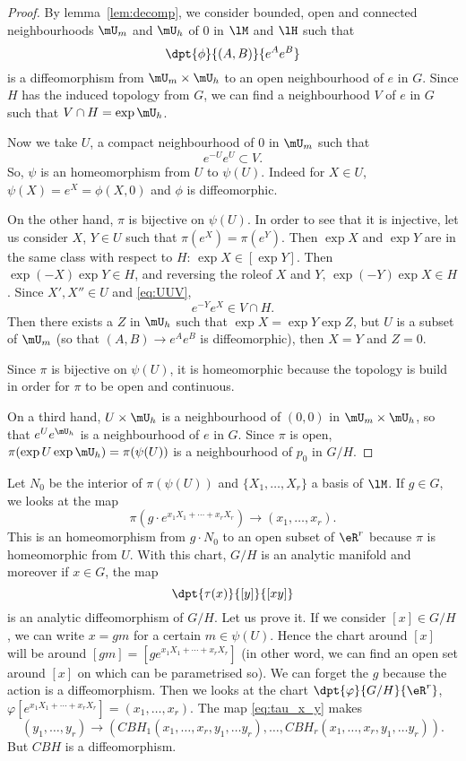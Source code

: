 \begin{proof}
By lemma~\ref{lem:decomp}, we consider bounded, open and connected neighbourhoods $\mU_m$ and $\mU_h$ of $0$ in $\lM$ and $\lH$ such that
\[
  \dpt{\phi}{(A,B)}{e^Ae^B}
\]
is a diffeomorphism from $\mU_m\times\mU_h$ to an open neighbourhood of $e$ in $G$. Since $H$ has the induced topology from $G$, we can find a neighbourhood $V$ of $e$ in $G$ such that $V\cap H=\exp\mU_h$.

Now we take $U$, a compact neighbourhood of $0$ in $\mU_m$ such that
\begin{equation}\label{eq:UUV}
  e^{-U}e^{U}\subset V.
\end{equation}
So, $\psi$ is an homeomorphism from $U$ to $\psi(U)$. Indeed for $X\in U$, $\psi(X)=e^X=\phi(X,0)$ and $\phi$ is diffeomorphic.

On the other hand, $\pi$ is bijective on $\psi(U)$. In order to see that it is injective, let us consider $X$, $Y\in U$ such that $\pi(e^{X})=\pi(e^{Y})$. Then $\exp X$ and $\exp Y$ are in the same class with respect to $H$: $\exp X\in[\exp Y]$. Then $\exp(-X)\exp Y\in H$, and reversing the role\angl of $X$ and $Y$, $\exp(-Y)\exp X\in H$. Since $X',X''\in U$ and \eqref{eq:UUV},
\[
  e^{-Y}e^{X}\in V\cap H.
\]
Then there exists a $Z$ in $\mU_h$ such that $\exp X=\exp Y\exp Z$, but $U$ is a subset of $\mU_m$ (so that $(A,B)\to e^Ae^B$ is diffeomorphic), then $X=Y$ and $Z=0$.

Since $\pi$ is bijective on $\psi(U)$, it is homeomorphic because the topology is build in order for $\pi$ to be open and continuous.

On a third hand, $U\times\mU_h$ is a neighbourhood of $(0,0)$ in $\mU_m\times\mU_h$, so that $e^Ue^{\mU_h}$ is a neighbourhood of $e$ in $G$. Since $\pi$ is open, $\pi(\exp U\exp \mU_h)=\pi(\psi(U))$ is a neighbourhood of $p_0$ in $G/H$.
\end{proof}


Let $N_0$ be the interior of $\pi(\psi(U))$ and $\{X_1,\ldots, X_r\}$ a basis of $\lM$. If $g\in G$, we looks at the map
\[
  \pi(g\cdot e^{x_1X_1+\cdots+x_rX_r})\to(x_1,\ldots,x_r).
\]
This is an homeomorphism from $g\cdot N_0$ to an open subset of $\eR^r$ because $\pi$ is homeomorphic from $U$. With this chart, $G/H$ is an analytic manifold  and moreover if $x\in G$, the map
\begin{equation}\label{eq:tau_x_y}
  \dpt{\tau(x)}{[y]}{[xy]}
\end{equation}
is an analytic diffeomorphism of $G/H$. Let us prove it. If we consider $[x]\in G/H$, we can write $x=gm$ for a certain $m\in\psi(U)$. Hence the chart around $[x]$ will be around $[gm]=[ge^{x_1X_1+\cdots+x_rX_r}]$ (in other word, we can find an open set around $[x]$ on which can be parametrised so). We can forget the $g$ because the action is a diffeomorphism. Then we looks at the chart $\dpt{\varphi}{G/H}{\eR^r}$, $\varphi[e^{x_1X_1+\cdots+x_rX_r}]=(x_1,\ldots,x_r)$. The map \eqref{eq:tau_x_y} makes 
\begin{equation}
    (y_1,\ldots,y_r)\to( CBH_1(x_1,\ldots,x_r,y_1,\ldots y_r),\ldots, CBH_r(x_1,\ldots,x_r,y_1,\ldots y_r)).
\end{equation}
But $CBH$ is a diffeomorphism.

